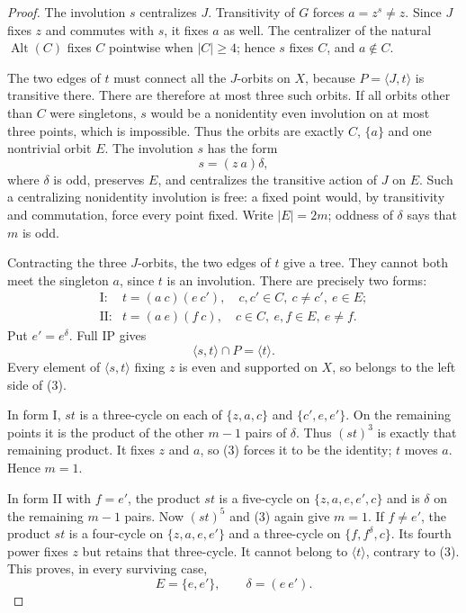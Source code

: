 \documentclass[11pt,a4paper]{article}
\newcommand{\gen}[1]{\langle#1\rangle}
\newcommand{\Alt}{\operatorname{Alt}}
\begin{document}
\begin{proof}
The involution $s$ centralizes $J$. Transitivity of $G$
forces $a=z^s\ne z$. Since $J$ fixes $z$ and commutes with
$s$, it fixes $a$ as well. The centralizer of the natural
$\Alt(C)$ fixes $C$ pointwise when $|C|\ge4$; hence $s$
fixes $C$, and $a\notin C$.

The two edges of $t$ must connect all the $J$-orbits on
$X$, because $P=\gen{J,t}$ is transitive there. There are
therefore at most three such orbits. If all orbits other
than $C$ were singletons, $s$ would be a nonidentity even
involution on at most three points, which is impossible.
Thus the orbits are exactly $C$, $\{a\}$ and one nontrivial
orbit $E$. The involution $s$ has the form
\[
                         s=(z\ a)\delta,
\]
where $\delta$ is odd, preserves $E$, and centralizes the
transitive action of $J$ on $E$. Such a centralizing
nonidentity involution is free: a fixed point would, by
transitivity and commutation, force every point fixed.
Write $|E|=2m$; oddness of $\delta$ says that $m$ is odd.

Contracting the three $J$-orbits, the two edges of $t$
give a tree. They cannot both meet the singleton $a$,
since $t$ is an involution. There are precisely two forms:
\[
 \begin{array}{ll}
 \text{I:}&t=(a\ c)(e\ c'),\quad c,c'\in C,\ c\ne c',\ e\in E;\\
 \text{II:}&t=(a\ e)(f\ c),\quad c\in C,\ e,f\in E,\ e\ne f.
 \end{array}                                             \tag{2}
\]
Put $e'=e^\delta$. Full IP gives
\[
          \gen{s,t}\cap P=\gen t.                        \tag{3}
\]
Every element of $\gen{s,t}$ fixing $z$ is even and
supported on $X$, so belongs to the left side of (3).

In form I, $st$ is a three-cycle on each of
$\{z,a,c\}$ and $\{c',e,e'\}$. On the remaining points
it is the product of the other $m-1$ pairs of $\delta$.
Thus $(st)^3$ is exactly that remaining product. It fixes
$z$ and $a$, so (3) forces it to be the identity; $t$
moves $a$. Hence $m=1$.

In form II with $f=e'$, the product $st$ is a five-cycle
on $\{z,a,e,e',c\}$ and is $\delta$ on the remaining
$m-1$ pairs. Now $(st)^5$ and (3) again give $m=1$.
If $f\ne e'$, the product $st$ is a four-cycle on
$\{z,a,e,e'\}$ and a three-cycle on
$\{f,f^\delta,c\}$. Its fourth power fixes $z$ but
retains that three-cycle. It cannot belong to $\gen t$,
contrary to (3). This proves, in every surviving case,
\[
                      E=\{e,e'\},\qquad\delta=(e\ e').   \tag{4}
\]


\end{proof}
\end{document}
